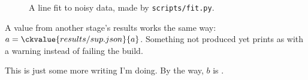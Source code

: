 \documentclass{article}
\begin{document}
\begin{figure}[h]
    \centering
    \caption{A line fit to noisy data, made by \texttt{scripts/fit.py}.}
    \label{fig:fit}
\end{figure}

\begin{table}[h]
    \centering
    \caption{Fit summary.}
    \label{tab:fit}
\end{table}

A value from another stage's results works the same way: $a =
\ckvalue{results/sup.json}{a}$. Something not produced yet prints as
 with a warning instead of failing
the build.

This is just some more writing I'm doing.
By the way, $b$ is .
\end{document}
